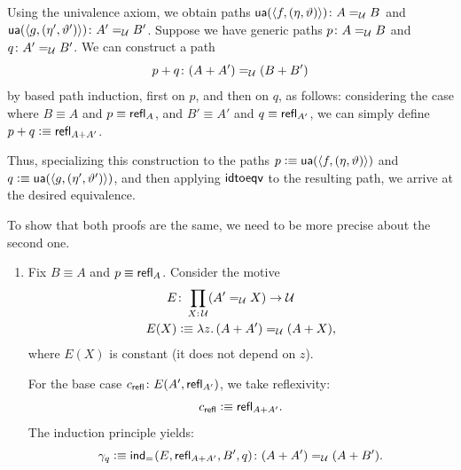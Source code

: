 \begin{solution}
\begin{enumerate}[a),font=\upshape]
\begin{enumerate}
            \bigskip
        
            Using the univalence axiom, we obtain paths $\fun{ua}(\dep{f,(\eta,\vartheta)})\colon A\eq\univ B$ and $\fun{ua}(\dep{g,(\eta',\vartheta')})\colon A'\eq\univ B'$. Suppose we have generic paths $p\colon A\eq\univ B$ and $q\colon A'\eq\univ B'$. We can construct a path
            \[
                p+q\colon(A+A')\eq\univ(B+B')
            \]
            by based path induction, first on $p$, and then on $q$, as follows: considering the case where $B\equiv A$ and $p\equiv\mathsf{refl}_A$, and $B'\equiv A'$ and $q\equiv\mathsf{refl}_{A'}$, we can simply define $p+q\mathrel{\vcentcolon}\equiv\mathsf{refl}_{A+A'}$.
            
            Thus, specializing this construction to the paths $p\mathrel{\vcentcolon}\equiv\mathsf{ua}(\langle f,(\eta,\vartheta)\rangle)$ and $q\mathrel{\vcentcolon}\equiv\mathsf{ua}(\langle g,(\eta',\vartheta')\rangle)$, and then applying $\mathsf{idtoeqv}$ to the resulting path, we arrive at the desired equivalence.

            \bigskip

            To show that both proofs are the same, we need to be more precise about the second one.
            \begin{enumerate}[-]
                \item Fix $B\equiv A$ and $p\equiv\mathsf{refl}_A$. Consider the motive
                \begin{align*}
                    E&\colon\prod_{X\colon\univ}(A'\eq{\univ}X)\to\univ\\
                    E(X)&\defeq\lambda z.\,
                        (A+A')\eq\univ(A+X),
                \end{align*}
                where $E(X)$ is constant (it does not depend on $z$).
                
                For the base case $c_{\fun{refl}}\colon E(A',\fun{refl}_{A'})$, we take reflexivity:
                \[
                    c_{\mathsf{refl}}\mathrel{\vcentcolon}\equiv\mathsf{refl}_{A+A'}.
                \]
                The induction principle yields:
                \[
                    \gamma_q\defeq
                        \fun{ind}_{\eq{}}(E,\fun{refl}_{A+A'},B',q)
                            \colon(A+A')\eq\univ(A+B').
                \]
            

\end{enumerate}
\end{enumerate}
\end{enumerate}
\end{solution}
